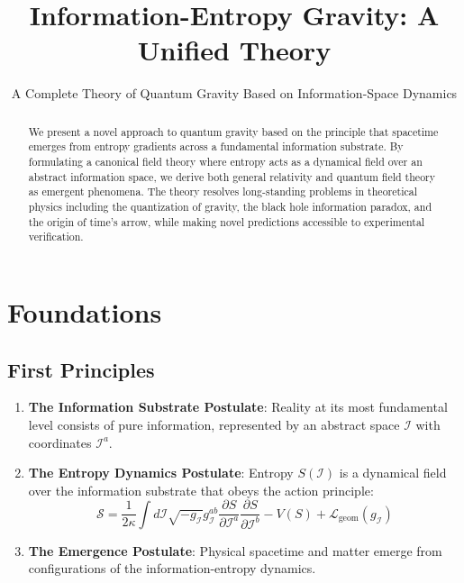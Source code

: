 \documentclass{article}
\title{Information-Entropy Gravity: A Unified Theory}
\author{A Complete Theory of Quantum Gravity Based on Information-Space Dynamics}
\date{}
\begin{document}
\maketitle

\begin{abstract}
We present a novel approach to quantum gravity based on the principle that spacetime emerges from entropy gradients across a fundamental information substrate. By formulating a canonical field theory where entropy acts as a dynamical field over an abstract information space, we derive both general relativity and quantum field theory as emergent phenomena. The theory resolves long-standing problems in theoretical physics including the quantization of gravity, the black hole information paradox, and the origin of time's arrow, while making novel predictions accessible to experimental verification.
\end{abstract}

\section{Foundations}

\subsection{First Principles}

\begin{enumerate}
\item \textbf{The Information Substrate Postulate}: Reality at its most fundamental level consists of pure information, represented by an abstract space $\mathcal{I}$ with coordinates $\mathcal{I}^a$.

\item \textbf{The Entropy Dynamics Postulate}: Entropy $S(\mathcal{I})$ is a dynamical field over the information substrate that obeys the action principle:
   \begin{equation}
   \mathcal{S} = \frac{1}{2\kappa} \int d\mathcal{I} \sqrt{-g_\mathcal{I}} g_\mathcal{I}^{ab} \frac{\partial S}{\partial \mathcal{I}^a} \frac{\partial S}{\partial \mathcal{I}^b} - V(S) + \mathcal{L}_{\text{geom}}(g_\mathcal{I})
   \end{equation}

\item \textbf{The Emergence Postulate}: Physical spacetime and matter emerge from configurations of the information-entropy dynamics.
\end{enumerate}
\end{document}
